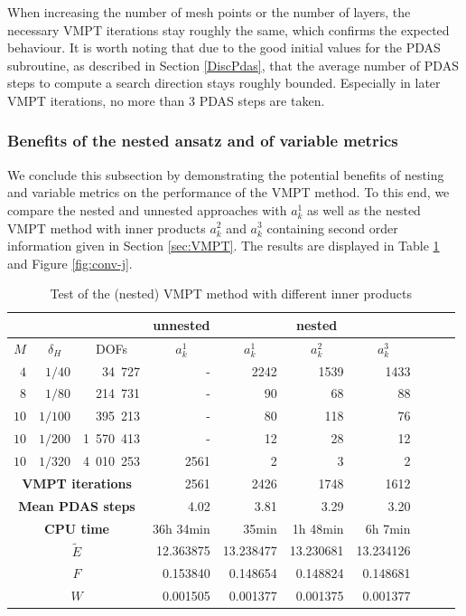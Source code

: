 \documentclass[a4paper,11pt]{article}
\theoremstyle{remark}
\begin{document}
When increasing the number of mesh points or the number of layers, the necessary VMPT iterations stay roughly the same, which confirms the expected behaviour.
It is worth noting that due to the good initial values for the PDAS subroutine, as described in Section \ref{DiscPdas}, that the average number of PDAS steps to compute a search direction stays roughly bounded. Especially in later VMPT iterations, no more than 3 PDAS steps are taken.

\subsubsection{Benefits of the nested ansatz and of variable metrics}
We conclude this subsection by demonstrating the potential benefits of nesting and variable metrics on the performance of the VMPT method. To this end, we compare the nested and unnested approaches with $a_k^1$ as well as the nested VMPT method with inner products
$a_k^2$ and $a_k^3$ 
containing second order information given in Section \ref{sec:VMPT}. The results are displayed in Table \ref{tab:SolverTest} and Figure \ref{fig:conv-j}.

\begin{table}[ht]
\centering
\begin{tabular}{|r |r |r |r |r |r |r |r |r |r |}
\hline \multicolumn{3}{|c|}{}& \multicolumn{1}{|c|}{unnested}& \multicolumn{3}{|c|}{nested} \\
\hline
\multicolumn{1}{|c|}{$M$}&\multicolumn{1}{|c|}{$\delta_H$} &  \multicolumn{1}{|c|}{DOFs}& \multicolumn{1}{|c|}{ $a^1_k$} & \multicolumn{1}{|c|}{ $a^1_k$} & \multicolumn{1}{|c|}{ $a^2_k$} & \multicolumn{1}{|c|}{ $a^3_k$} \\
\hline
\hline
$4$& ${1}/{40}$& 34~727  & - & 2242 & 1539 & 1433 \\
\hline
$8$& ${1}/{80}$& 214~731  & - & 90 & 68 & 88  \\
\hline
$10$& ${1}/{100}$& 395~213 & - & 80 & 118 & 76  \\
\hline
$10$& ${1}/{200}$& 1~570~413 & - & 12 & 28 & 12  \\
\hline
$10$& ${1}/{320}$& 4~010~253 & 2561 & 2 & 3 & 2  \\
\hline
\hline
\multicolumn{3}{|c|}{\textbf{VMPT iterations}} & 2561 & 2426 & 1748 & 1612   \\
\hline
\multicolumn{3}{|c|}{\textbf{Mean PDAS steps}} & 4.02 & 3.81 & 3.29 & 3.20   \\
\hline
\multicolumn{3}{|c|}{\textbf{CPU time}} & 36h 34min & 35min
& 1h 48min & 6h 7min   \\
\hline
\hline
\multicolumn{3}{|c|}{\textbf{$\tilde{E}$}} & 12.363875 & 13.238477 & 13.230681 & 13.234126  \\
\hline
\multicolumn{3}{|c|}{\textbf{$F$}} & 0.153840 & 0.148654 & 0.148824 & 0.148681 \\
\hline
\multicolumn{3}{|c|}{\textbf{$W$}} & 0.001505 & 0.001377 & 0.001375 & 0.001377   \\
\hline  
\end{tabular}
\caption{Test of the (nested) VMPT method with different inner products
  \label{tab:SolverTest}}
\end{table}
\end{document}

